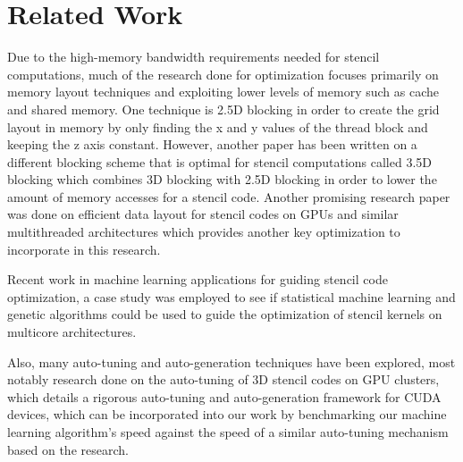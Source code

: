 \documentclass[conference]{IEEEtran}
\begin{document}
\section{Related Work}
	Due to the high-memory bandwidth requirements needed for stencil computations, much of the research done for optimization focuses primarily on memory layout techniques and exploiting lower levels of memory such as cache and shared memory. One technique is 2.5D blocking in order to create the grid layout in memory by only finding the x and y values of the thread block and keeping the z axis constant\cite{Datta}. However, another paper has been written on a different blocking scheme that is optimal for stencil computations called 3.5D blocking which combines 3D blocking with 2.5D blocking in order to lower the amount of memory accesses for a stencil code\cite{Nguy}. Another promising research paper was done on efficient data layout for stencil codes on GPUs and similar multithreaded architectures which provides another key optimization to incorporate in this research\cite{Jaeger}. 

	{\color{red}Recent work in machine learning applications for guiding stencil code optimization, a case study was employed to see if statistical machine learning and genetic algorithms could be used to guide the optimization of stencil kernels on multicore architectures\cite{Gana}.}

	Also, many auto-tuning and auto-generation techniques have been explored, most notably research done on the auto-tuning of 3D stencil codes on GPU clusters, which details a rigorous auto-tuning and auto-generation framework for CUDA devices, which can be incorporated into our work by benchmarking our machine learning algorithm's speed against the speed of a similar auto-tuning mechanism based on the research\cite{Zhang}. 


\end{document}

